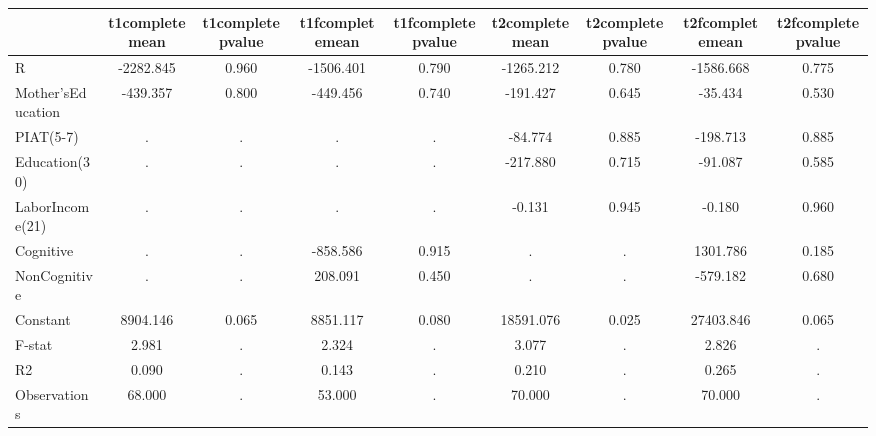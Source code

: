 \begin{table}[htbp]
\begin{tabular}{lcccccccc} \hline \hline
 & t1completemean  & t1completepvalue  & t1fcompletemean  & t1fcompletepvalue  & t2completemean  & t2completepvalue  & t2fcompletemean  & t2fcompletepvalue  \\  \hline 
R & -2282.845 &     0.960 & -1506.401 &     0.790 & -1265.212 &     0.780 & -1586.668 &     0.775 \\  
Mother'sEducation &  -439.357 &     0.800 &  -449.456 &     0.740 &  -191.427 &     0.645 &   -35.434 &     0.530 \\  
PIAT(5-7) &         . &         . &         . &         . &   -84.774 &     0.885 &  -198.713 &     0.885 \\  
Education(30) &         . &         . &         . &         . &  -217.880 &     0.715 &   -91.087 &     0.585 \\  
LaborIncome(21) &         . &         . &         . &         . &    -0.131 &     0.945 &    -0.180 &     0.960 \\  
Cognitive &         . &         . &  -858.586 &     0.915 &         . &         . &  1301.786 &     0.185 \\  
NonCognitive &         . &         . &   208.091 &     0.450 &         . &         . &  -579.182 &     0.680 \\  
Constant &  8904.146 &     0.065 &  8851.117 &     0.080 & 18591.076 &     0.025 & 27403.846 &     0.065 \\  
F-stat &     2.981 &         . &     2.324 &         . &     3.077 &         . &     2.826 &         . \\  
R2 &     0.090 &         . &     0.143 &         . &     0.210 &         . &     0.265 &         . \\  
Observations &    68.000 &         . &    53.000 &         . &    70.000 &         . &    70.000 &         . \\  
\hline \hline \end{tabular}
\end{table}
